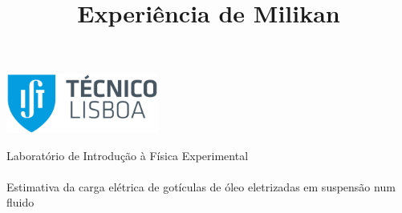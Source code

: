 \thispagestyle {empty}
\begin{center}
\begin{minipage}[c][5cm][t]{\textwidth}
\begin{center}
\includegraphics[width=5cm]{../IST_A_RGB_POS.png}
\end{center}

\end{minipage}
\begin{minipage}[t][10cm][c]{\textwidth}
\centering
{\FontMb Laboratório de Introdução à Física Experimental} \\
\paragraph{}
\centering
{\FontLb\Huge \title{Experiência de Milikan}}
\paragraph{}
{\FontMb Estimativa da carga elétrica de gotículas de óleo eletrizadas em suspensão num fluido} \\
\paragraph{}
{}
\end{minipage}

\begin{minipage}[c][1.5cm][c]{\textwidth}
\centering
{\FontLn }
\end{minipage}

\begin{minipage}[c][1.5cm][c]{\textwidth}
\centering



\end{minipage}
\begin{minipage}[c][3cm][c]{\textwidth}
\centering
\renewcommand{\arraystretch}{1.4}

\maketitle

\vspace{-5mm}
\hline
\vspace{-3mm}
\begin{center}
\centering

\end{center}
\end{minipage}
\end{center}
